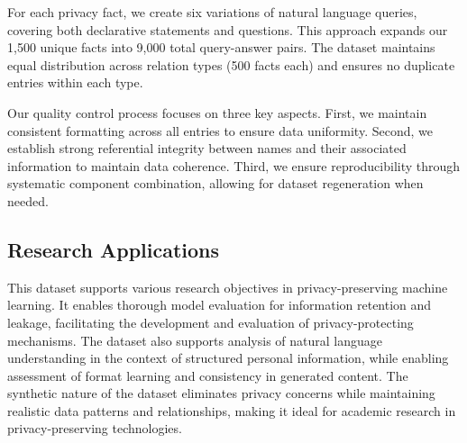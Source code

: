 For each privacy fact, we create six variations of natural language queries, covering both declarative statements and questions. This approach expands our 1,500 unique facts into 9,000 total query-answer pairs. The dataset maintains equal distribution across relation types (500 facts each) and ensures no duplicate entries within each type.

Our quality control process focuses on three key aspects. First, we maintain consistent formatting across all entries to ensure data uniformity. Second, we establish strong referential integrity between names and their associated information to maintain data coherence. Third, we ensure reproducibility through systematic component combination, allowing for dataset regeneration when needed.

\subsection{Research Applications}
This dataset supports various research objectives in privacy-preserving machine learning. It enables thorough model evaluation for information retention and leakage, facilitating the development and evaluation of privacy-protecting mechanisms. The dataset also supports analysis of natural language understanding in the context of structured personal information, while enabling assessment of format learning and consistency in generated content. The synthetic nature of the dataset eliminates privacy concerns while maintaining realistic data patterns and relationships, making it ideal for academic research in privacy-preserving technologies.
